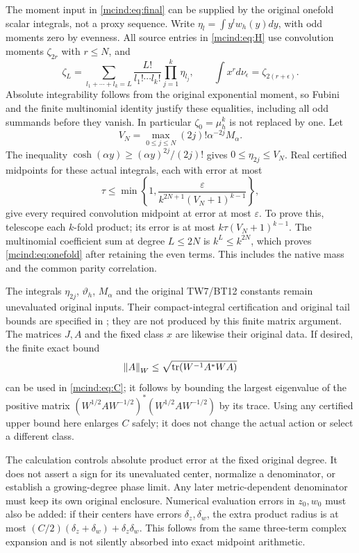 \documentclass[11pt]{article}
\begin{document}
The moment input in \eqref{mcind:eq:final} can be supplied by the
original onefold scalar integrals, not a proxy sequence. Write
$\eta_l=\int y^lw_h(y)dy$, with odd moments zero by evenness.
All source entries in \eqref{mcind:eq:H} use convolution moments
$\zeta_{2r}$ with $r\le N$, and
\[
 \zeta_L=\sum_{l_1+\cdots+l_k=L}
             \frac{L!}{l_1!\cdots l_k!}\prod_{j=1}^k\eta_{l_j},
 \qquad \int x^r d\nu_\epsilon=\zeta_{2(r+\epsilon)}.
\]
Absolute integrability follows from the original exponential
moment, so Fubini and the finite multinomial identity justify
these equalities, including all odd summands before they vanish.
In particular $\zeta_0=\mu_h^k$ is not replaced by one.
Let
\[
 V_N=\max_{0\le j\le N}(2j)!\alpha^{-2j}M_\alpha.
\]
The inequality $\cosh(\alpha y)\ge(\alpha y)^{2j}/(2j)!$
gives $0\le\eta_{2j}\le V_N$. Real certified midpoints for
these actual integrals, each with error at most
\begin{equation}\tag{MC16}\label{mcind:eq:onefold}
 \tau\le\min\left\{1,
         \frac{\varepsilon}{k^{2N+1}(V_N+1)^{k-1}}\right\},
\end{equation}
give every required convolution midpoint at error at most
$\varepsilon$. To prove this, telescope each $k$-fold product;
its error is at most $k\tau(V_N+1)^{k-1}$. The multinomial
coefficient sum at degree $L\le2N$ is $k^L\le k^{2N}$,
which proves \eqref{mcind:eq:onefold} after retaining the even terms.
This includes the native mass and the common parity correlation.

The integrals $\eta_{2j}$, $\vartheta_h$, $M_\alpha$ and the
original TW7/BT12 constants remain unevaluated original inputs.
Their compact-integral certification and original tail bounds
are specified in \cite{mcind:NP}; they are not produced by this finite
matrix argument. The matrices $J,A$ and the fixed class $x$ are
likewise their original data. If desired, the finite exact bound
\[
 \left\lVert A\right\rVert_W\le\sqrt{\operatorname{tr}(W^{-1}A^*WA)}
\]
can be used in \eqref{mcind:eq:C}; it follows by bounding the largest
eigenvalue of the positive matrix
$(W^{1/2}AW^{-1/2})^*(W^{1/2}AW^{-1/2})$ by its trace.
Using any certified upper bound here enlarges $C$ safely; it does
not change the actual action or select a different class.

The calculation controls absolute product error at the fixed
original degree. It does not assert a sign for its unevaluated
center, normalize a denominator, or establish a growing-degree
phase limit. Any later metric-dependent denominator must keep its
own original enclosure. Numerical evaluation errors in $z_0,w_0$
must also be added: if their centers have errors $\delta_z,
\delta_w$, the extra product radius is at most
$(C/2)(\delta_z+\delta_w)+\delta_z\delta_w$. This follows
from the same three-term complex expansion and is not silently
absorbed into exact midpoint arithmetic.
\end{document}
